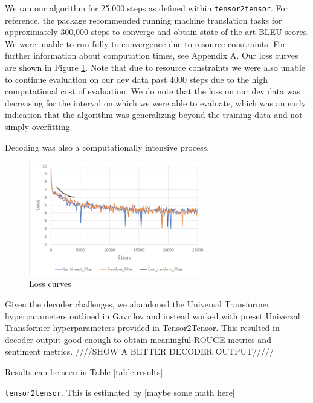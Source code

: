 \documentclass[11pt]{article}
\begin{document}
We ran our algorithm for 25,000 steps as defined within \texttt{tensor2tensor}. For reference, the package recommended running machine translation tasks for approximately 300,000 steps to converge and obtain state-of-the-art BLEU scores. We were unable to run fully to convergence due to resource constraints. For further information about computation times, see Appendix A. Our loss curves are shown in Figure \ref{figure:loss}. Note that due to resource constraints we were also unable to continue evaluation on our dev data past 4000 steps due to the high computational cost of evaluation. We do note that the loss on our dev data was decreasing for the interval on which we were able to evaluate, which was an early indication that the algorithm was generalizing beyond the training data and not simply overfitting.

Decoding was also a computationally intensive process. 

\begin{figure}
  \centering
  \includegraphics[width=7.8cm]{loss.png}
  \caption{Loss curves}
  \label{figure:loss}
\end{figure}

Given the decoder challenges, we abandoned the Universal Transformer hyperparameters outlined in Gavrilov and instead worked with preset Universal Transformer hyperparameters provided in Tensor2Tensor. This resulted in decoder output good enough to obtain meaningful ROUGE metrics and sentiment metrics. 
////SHOW A BETTER DECODER OUTPUT/////

Results can be seen in Table \ref{table:results}

 \texttt{tensor2tensor}. This is estimated by [maybe some math here]
\end{document}
